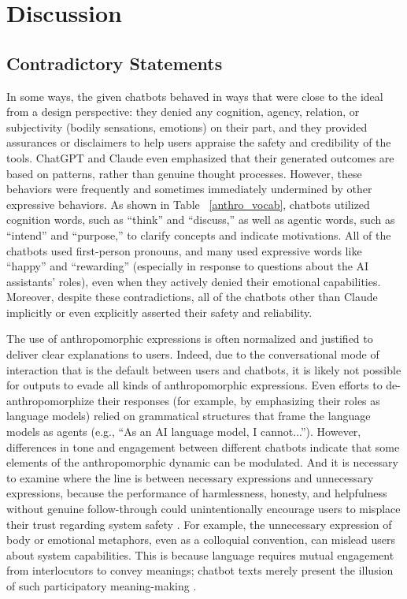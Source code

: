 \section{Discussion}


\subsection{Contradictory Statements}

In some ways, the given chatbots behaved in ways that were close to the ideal from a design perspective: they denied any cognition, agency, relation, or subjectivity (bodily sensations, emotions) on their part, and they provided assurances or disclaimers to help users appraise the safety and credibility of the tools. ChatGPT and Claude even emphasized that their generated outcomes are based on patterns, rather than genuine thought processes. However, these behaviors were frequently and sometimes immediately undermined by other expressive behaviors. As shown in Table ~\ref{anthro_vocab}, chatbots utilized cognition words, such as ``think'' and ``discuss,'' as well as agentic words, such as ``intend'' and ``purpose,'' to clarify concepts and indicate motivations. All of the chatbots used first-person pronouns, and many used expressive words like ``happy'' and ``rewarding'' (especially in response to questions about the AI assistants' roles), even when they actively denied their emotional capabilities. Moreover, despite these contradictions, all of the chatbots other than Claude implicitly or even explicitly asserted their safety and reliability.

The use of anthropomorphic expressions is often normalized and justified to deliver clear explanations to users. Indeed, due to the conversational mode of interaction that is the default between users and chatbots, it is likely not possible for outputs to evade all kinds of anthropomorphic expressions. Even efforts to de-anthropomorphize their responses (for example, by emphasizing their roles as language models) relied on grammatical structures that frame the language models as agents (e.g., ``As an AI language model, I cannot...''). However, differences in tone and engagement between different chatbots indicate that some elements of the anthropomorphic dynamic can be modulated. And it is necessary to examine where the line is between necessary expressions and unnecessary expressions, because the performance of harmlessness, honesty, and helpfulness without genuine follow-through could unintentionally encourage users to misplace their trust regarding system safety \citep{weidinger2021ethical,gabriel2024ethics}. For example, the unnecessary expression of body or emotional metaphors, even as a colloquial convention, can mislead users about system capabilities. This is because language requires mutual engagement from interlocutors to convey meanings; chatbot texts merely present the illusion of such participatory meaning-making \citep{birhane2024large}. 

